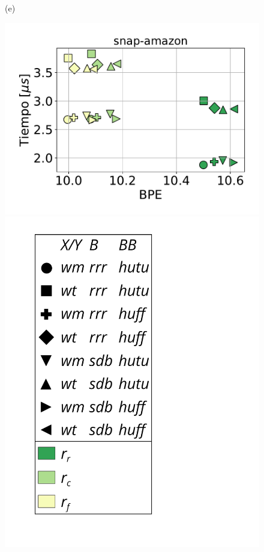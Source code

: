 \begin{figure}
\begin{minipage}{1\textwidth}
\begin{minipage}{0.45\textwidth}
    			(e)
    		\end{minipage}
    		\begin{minipage}{0.45\textwidth}
    			\centering
    			\begin{minipage}{0.75\textwidth}
    				\centering
    				\includegraphics[width=1\linewidth]{img/sdsl/secuencial/snap-amazon.pdf}
    			\end{minipage}
    			\begin{minipage}{0.2\textwidth}
    				\centering
    				\includegraphics[scale=.16, clip, trim=70 0 0 0]{img/sdsl/label.pdf}

\end{minipage}
\end{minipage}
\end{minipage}
\end{figure}
